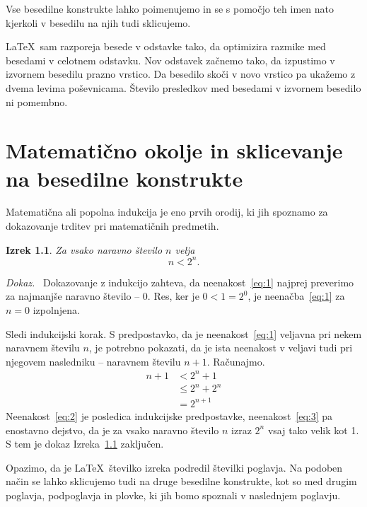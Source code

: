 \documentclass[a4paper, 12pt]{book}
\newtheorem{izrek}{Izrek}[chapter]
\newenvironment{dokaz}{\emph{Dokaz.}\ }{\hspace{\fill}{$\Box$}}
\begin{document}
Vse besedilne konstrukte lahko poimenujemo in se s pomočjo teh imen nato  kjerkoli v besedilu na njih  tudi sklicujemo.

\LaTeX\ sam razporeja besede v odstavke tako, da optimizira razmike med besedami v celotnem odstavku.
Nov odstavek začnemo tako, da izpustimo v izvornem besedilu prazno vrstico. Da besedilo skoči v novo vrstico pa ukažemo z dvema levima poševnicama.
Število presledkov med besedami v izvornem besedilo ni pomembno.


\chapter{Matematično okolje in sklicevanje na besedilne konstrukte}
\label{ch1}



Matematična ali popolna indukcija je eno prvih orodij, ki jih spoznamo za dokazovanje trditev pri matematičnih predmetih.
\begin{izrek}
\label{iz:1}
Za vsako naravno število $n$ velja
\begin{equation}
n < 2^n.
\label{eq:1}
\end{equation}
\end{izrek}
\begin{dokaz}
Dokazovanje z indukcijo zahteva, da neenakost~\eqref{eq:1} najprej preverimo za najmanjše naravno število -- $0$. 
Res, ker je $0 < 1 = 2^0$, je neenačba~\eqref{eq:1} za $n=0$ izpolnjena.

Sledi indukcijski korak. S predpostavko, da je neenakost~\eqref{eq:1} veljavna pri nekem naravnem številu $n$, je potrebno pokazati, da je ista neenakost v veljavi tudi pri njegovem nasledniku -- naravnem številu $n+1$. 
Računajmo.
\begin{align}
n+1 & < 2^n + 1       \label{eq:2}\\
       & \le 2^n + 2^n \label{eq:3}\\
       & = 2^{n+1}       \nonumber
\end{align}
Neenakost~\eqref{eq:2} je posledica indukcijske predpostavke, neenakost~\eqref{eq:3} pa enostavno dejstvo, da je za vsako naravno število $n$ izraz $2^n$ vsaj tako velik kot 1. 
S tem je dokaz Izreka~\ref{iz:1} zaključen.
\end{dokaz}

Opazimo, da je \LaTeX\ številko izreka podredil številki poglavja.
Na podoben način se lahko sklicujemo tudi na druge besedilne konstrukte, kot so med drugim poglavja, podpoglavja in plovke, ki jih bomo spoznali v naslednjem poglavju.
\end{document}
